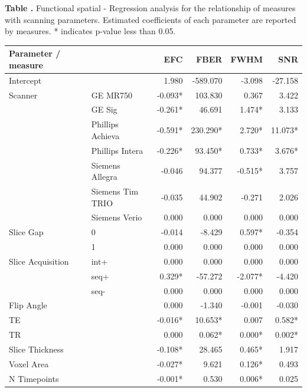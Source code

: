 \documentclass{frontiersSCNS} %
\begin{document}
\begin{table}
  \textbf{\label{func_spat_reg} Table .}{ Functional spatial - Regression analysis for the relationship of measures with scanning parameters. Estimated coefficients of each parameter are reported by measures. * indicates p-value less than 0.05.  }
  \begin{center}
  
    \begin{tabular}{ l l r r r r }
    \hline
    Parameter / measure & & EFC & FBER & FWHM & SNR \\ \hline
    Intercept & & 1.980 & -589.070 & -3.098 & -27.158 \\
    Scanner & GE MR750 & -0.093* & 103.830 & 0.367 & 3.422 \\
     & GE Sig & -0.261* & 46.691 & 1.474* & 3.133 \\
     & Phillips Achieva & -0.591* & 230.290* & 2.720* & 11.073* \\
     & Phillips Intera & -0.226* & 93.450* & 0.733* & 3.676* \\
     & Siemens Allegra & -0.046 & 94.377 & -0.515* & 3.757 \\
     & Siemens Tim TRIO & -0.035 & 44.902 & -0.271 & 2.026 \\
     & Siemens Verio & 0.000 & 0.000 & 0.000 & 0.000 \\
    Slice Gap & 0 & -0.014 & -8.429 & 0.597* & -0.354 \\
     & 1 & 0.000 & 0.000 & 0.000 & 0.000 \\
    Slice Acquisition & int+ & 0.000 & 0.000 & 0.000 & 0.000 \\
     & seq+ & 0.329* & -57.272 & -2.077* & -4.420 \\
     & seq- & 0.000 & 0.000 & 0.000 & 0.000 \\
    Flip Angle & & 0.000 & -1.340 & -0.001 & -0.030 \\
    TE & & -0.016* & 10.653* & 0.007 & 0.582* \\
    TR & & 0.000 & 0.062* & 0.000* & 0.002* \\
    Slice Thickness & & -0.108* & 28.465 & 0.465* & 1.917 \\
    Voxel Area & & -0.027* & 9.621 & 0.126* & 0.493 \\
    N Timepoints & & -0.001* & 0.530 & 0.006* & 0.025 \\
    \hline
    \end{tabular}
  \end{center}
\end{table}
\end{document}
